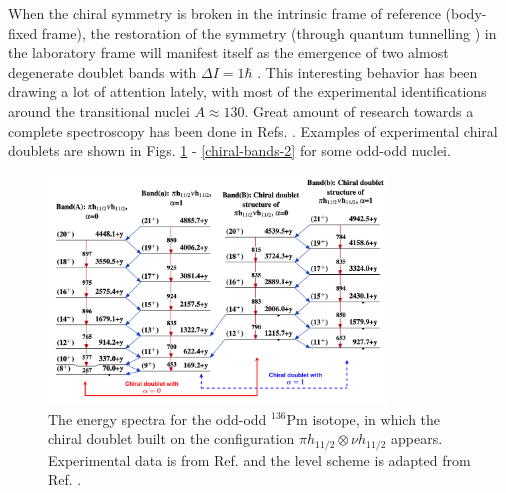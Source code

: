 When the chiral symmetry is broken in the intrinsic frame of reference (body-fixed frame), the restoration of the symmetry (through quantum tunnelling \cite{zhang2007chiral}) in the laboratory frame will manifest itself as the emergence of two almost degenerate doublet bands with $\Delta I=1\hbar$ \cite{frauendorf1997tilted}. This interesting behavior has been drawing a lot of attention lately, with most of the experimental identifications around the transitional nuclei $A\approx 130$. Great amount of research towards a complete spectroscopy has been done in Refs. \cite{starosta2001chiral,meng2008chiral,budaca2018tilted,budaca2018semiclassical,budaca2021chiral}. Examples of experimental chiral doublets are shown in Figs. \ref{chiral-bands-1} - \ref{chiral-bands-2} for some odd-odd nuclei.
\begin{figure}
    \centering
    \includegraphics[width=0.8\textwidth]{Chapters/Figures/Chiral_136Pm.pdf}
    \caption{The energy spectra for the odd-odd $^{136}$Pm isotope, in which the chiral doublet built on the configuration $\pi h_{11/2}\otimes\nu h_{11/2}$ appears. Experimental data is from Ref. \cite{mccutchan2018nuclear} and the level scheme is adapted from Ref. \cite{bhat1992evaluated}.}
    \label{chiral-bands-1}
\end{figure}
